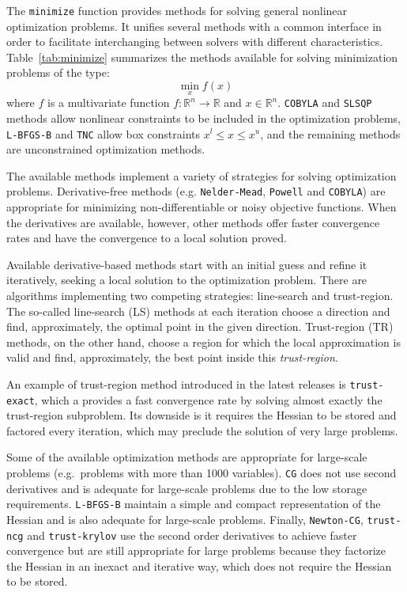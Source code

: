 The \texttt{minimize} function provides methods for solving general nonlinear optimization
problems. It unifies several methods with a common interface in order to facilitate
interchanging between solvers with different characteristics.  Table~\ref{tab:minimize} summarizes
the methods available for solving minimization problems of the type:
\begin{equation}
  \label{eq:minimization-prob}
  \min_x f(x)
\end{equation}
where $f$ is a multivariate function $f: \mathbb{R}^n \rightarrow \mathbb{R}$ and $x \in \mathbb{R}^n$.
\texttt{COBYLA} and \texttt{SLSQP} methods allow nonlinear constraints to be included in the optimization
problems, \texttt{L-BFGS-B} and \texttt{TNC} allow box constraints $x^l \le x \le x^u$,
and the remaining methods are unconstrained optimization methods.



The available methods implement a variety of strategies for solving optimization problems.
Derivative-free methods (e.g. \texttt{Nelder-Mead}, \texttt{Powell} and \texttt{COBYLA}) are appropriate for minimizing non-differentiable or
noisy objective functions. When the derivatives are available, however, other methods offer faster convergence rates
and have the convergence to a local solution proved.

Available derivative-based methods start with an initial guess and refine it iteratively, seeking
a local solution to the optimization problem. There are algorithms implementing two competing strategies:
line-search and trust-region. The so-called line-search (LS) methods at each iteration choose a direction
and find, approximately, the optimal point in the given direction. Trust-region (TR) methods, on the other
hand, choose a region for which the local approximation is valid and find, approximately, the  best point
inside this \textit{trust-region}.

An example of trust-region method introduced in the latest releases is \texttt{trust-exact},
which a  provides a fast convergence rate by solving  almost exactly the trust-region subproblem.
Its downside is it requires the Hessian to be stored and factored every iteration, which may preclude
the solution of very large problems.

Some of the available optimization methods are appropriate for large-scale problems
(e.g.~problems with more than 1000 variables).
\texttt{CG} does not use second derivatives and is adequate for large-scale problems due to the low storage requirements.
\texttt{L-BFGS-B} maintain a simple and compact representation of the Hessian and is also adequate for large-scale problems.
Finally, \texttt{Newton-CG}, \texttt{trust-ncg} and \texttt{trust-krylov} use the second order derivatives to achieve faster
convergence but are still appropriate for large problems because they factorize the Hessian in an inexact and iterative way,
which does not require the Hessian to be stored.

